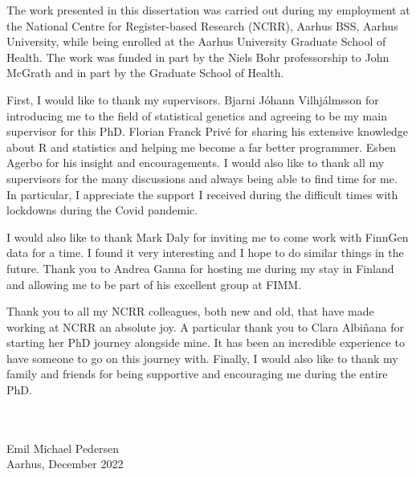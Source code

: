The work presented in this dissertation was carried out during my employment at the National Centre for Register-based Research (NCRR), Aarhus BSS, Aarhus University, while being enrolled at the Aarhus University Graduate School of Health. The work was funded in part by the Niels Bohr professorship to John McGrath and in part by the Graduate School of Health.

First, I would like to thank my supervisors. Bjarni Jóhann Vilhjálmsson for introducing me to the field of statistical genetics and agreeing to be my main supervisor for this PhD. Florian Franck Privé for sharing his extensive knowledge about R and statistics and helping me become a far better programmer. Esben Agerbo for his insight and encouragements. I would also like to thank all my supervisors for the many discussions and always being able to find time for me. In particular, I appreciate the support I received during the difficult times with lockdowns during the Covid pandemic. 

I would also like to thank Mark Daly for inviting me to come work with FinnGen data for a time. I found it very interesting and I hope to do similar things in the future. Thank you to Andrea Ganna for hosting me during my stay in Finland and allowing me to be part of his excellent group at FIMM. 

Thank you to all my NCRR colleagues, both new and old, that have made working at NCRR an absolute joy. A particular thank you to Clara Albiñana for starting her PhD journey alongside mine. It has been an incredible experience to have someone to go on this journey with. Finally, I would also like to thank my family and friends for being supportive and encouraging me during the entire PhD.



\mbox{}\\
\mbox{}\\
Emil Michael Pedersen\\
Aarhus, December 2022